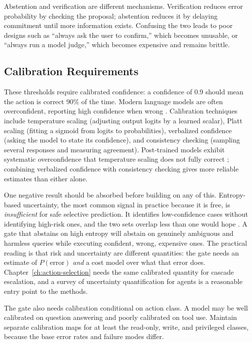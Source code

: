 \documentclass[11pt]{book}
\begin{document}
Abstention and verification are different mechanisms. Verification reduces error probability by checking the proposal; abstention reduces it by delaying commitment until more information exists. Confusing the two leads to poor designs such as ``always ask the user to confirm,'' which becomes unusable, or ``always run a model judge,'' which becomes expensive and remains brittle.

\subsection{Calibration Requirements}

These thresholds require calibrated confidence: a confidence of 0.9 should mean the action is correct 90\% of the time. Modern language models are often overconfident, reporting high confidence when wrong \cite{guo2017calibration}. Calibration techniques include temperature scaling (adjusting output logits by a learned scalar), Platt scaling (fitting a sigmoid from logits to probabilities), verbalized confidence (asking the model to state its confidence), and consistency checking (sampling several responses and measuring agreement). Post-trained models exhibit systematic overconfidence that temperature scaling does not fully correct \cite{tian2023just}; combining verbalized confidence with consistency checking gives more reliable estimates than either alone.

One negative result should be absorbed before building on any of this. Entropy-based uncertainty, the most common signal in practice because it is free, is \textit{insufficient} for safe selective prediction. It identifies low-confidence cases without identifying high-risk ones, and the two sets overlap less than one would hope \cite{entropyinsuff2026}. A gate that abstains on high entropy will abstain on genuinely ambiguous and harmless queries while executing confident, wrong, expensive ones. The practical reading is that risk and uncertainty are different quantities: the gate needs an estimate of $P(\text{error})$ \textit{and} a cost model over what that error does. Chapter~\ref{ch:action-selection} needs the same calibrated quantity for cascade escalation, and a survey of uncertainty quantification for agents \cite{uqagents2026} is a reasonable entry point to the methods.

The gate also needs calibration conditional on action class. A model may be well calibrated on question answering and poorly calibrated on tool use. Maintain separate calibration maps for at least the read-only, write, and privileged classes, because the base error rates and failure modes differ.
\end{document}
